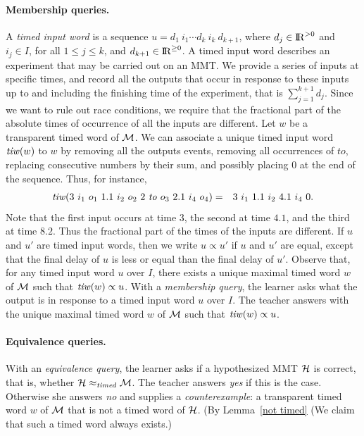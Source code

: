 \paragraph{Membership queries.}
A \emph{timed input word} is a sequence
$u = d_1 ~ i_1 \cdots d_k ~ i_k ~ d_{k+1}$, where $d_j \in {\rm I\!R}^{> 0}$ and $i_j \in I$, for all $1 \leq j \leq k$,
and $d_{k+1} \in {\rm I\!R}^{\geq 0}$.
A timed input word describes an experiment that may be carried out on an MMT. We provide a series of inputs at specific times, and record all the outputs that occur in response to these inputs up to and including the finishing time of the experiment, that is $\sum_{j=1}^{k+1} d_j$.
Since we want to rule out race conditions, we require that the fractional part of the absolute times of occurrence of
all the inputs are different.
Let $w$ be a transparent timed word of ${\cal M}$.
We can associate a unique timed input word $\mathit{tiw}(w)$ to $w$ by 
removing all the outputs events, 
removing all occurrences of $\mathit{to}$, 
replacing consecutive numbers by their sum, 
and possibly placing $0$ at the end of the sequence.
Thus, for instance,
\begin{eqnarray*}
\mathit{tiw} (3 ~ i_1 ~ o_1 ~ 1.1 ~ i_2 ~ o_2 ~ 2 ~ \mathit{to} ~ o_3 ~ 2.1 ~ i_4 ~ o_4) & = & 
3 ~ i_1 ~ 1.1 ~ i_2 ~ 4.1 ~ i_4 ~ 0.
\end{eqnarray*}
\iflong
Note that the first input occurs at time $3$, the second at time $4.1$, and the third at time $8.2$.
Thus the fractional part of the times of the inputs are different.
\fi
%
If $u$ and $u'$ are timed input words, then we write $u \propto u'$ if $u$ and $u'$ are equal, except that the final delay of $u$ is less or equal than the final delay of $u'$. Observe that,
for any timed input word $u$ over $I$, 
there exists a unique maximal timed word $w$ of ${\cal M}$ such that $\mathit{tiw}(w) \propto u$.
With a \emph{membership query}, the learner asks what the output is in response to a timed input word $u$ over $I$. 
The teacher answers with the unique maximal timed word $w$ of ${\cal M}$ such that $\mathit{tiw}(w) \propto u$.

\paragraph{Equivalence queries.}
With an \emph{equivalence query}, the learner asks if a hypothesized MMT ${\cal H}$ is correct, that is, 
whether ${\cal H} \approx_{\mathit{timed}} {\cal M}$.
The teacher answers \emph{yes} if this is the case. Otherwise she answers \emph{no} and supplies a
\emph{counterexample}: a transparent timed word $w$ of ${\cal M}$ that is not a timed word of ${\cal H}$.
\iflong
(By Lemma~\ref{not timed} 
\else
(We claim that
\fi
such a timed word always exists.)

